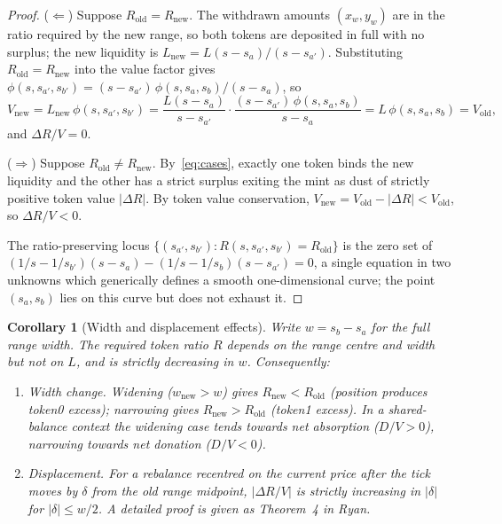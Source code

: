 \documentclass[11pt,a4paper]{article}
\newtheorem*{corollary}{Corollary}
\begin{document}
\begin{proof}
($\Leftarrow$) Suppose $R_{\text{old}} = R_{\text{new}}$. The withdrawn amounts $(x_w, y_w)$ are in the ratio required by the new range, so both tokens are deposited in full with no surplus; the new liquidity is $L_{\text{new}} = L(s - s_a)/(s - s_{a'})$. Substituting $R_{\text{old}} = R_{\text{new}}$ into the value factor gives $\phi(s, s_{a'}, s_{b'}) = (s - s_{a'})\,\phi(s, s_a, s_b)/(s - s_a)$, so
\[
V_{\text{new}} = L_{\text{new}}\,\phi(s, s_{a'}, s_{b'}) = \frac{L(s - s_a)}{s - s_{a'}} \cdot \frac{(s - s_{a'})\,\phi(s, s_a, s_b)}{s - s_a} = L\,\phi(s, s_a, s_b) = V_{\text{old}},
\]
and $\Delta R/V = 0$.

($\Rightarrow$) Suppose $R_{\text{old}} \neq R_{\text{new}}$. By~\eqref{eq:cases}, exactly one token binds the new liquidity and the other has a strict surplus exiting the mint as dust of strictly positive token value $|\Delta R|$. By token value conservation, $V_{\text{new}} = V_{\text{old}} - |\Delta R| < V_{\text{old}}$, so $\Delta R/V < 0$.

The ratio-preserving locus $\{(s_{a'}, s_{b'}) : R(s, s_{a'}, s_{b'}) = R_{\text{old}}\}$ is the zero set of $(1/s - 1/s_{b'})(s - s_a) - (1/s - 1/s_b)(s - s_{a'}) = 0$, a single equation in two unknowns which generically defines a smooth one-dimensional curve; the point $(s_a, s_b)$ lies on this curve but does not exhaust it.
\end{proof}

\begin{corollary}[Width and displacement effects]
Write $w = s_b - s_a$ for the full range width. The required token ratio $R$ depends on the range centre and width but not on $L$, and is strictly decreasing in $w$. Consequently:
\begin{enumerate}[label=(\roman*),leftmargin=*]
    \item \emph{Width change.} Widening ($w_{\text{new}} > w$) gives $R_{\text{new}} < R_{\text{old}}$ (position produces token0 excess); narrowing gives $R_{\text{new}} > R_{\text{old}}$ (token1 excess). In a shared-balance context the widening case tends towards net absorption ($D/V > 0$), narrowing towards net donation ($D/V < 0$).
    \item \emph{Displacement.} For a rebalance recentred on the current price after the tick moves by $\delta$ from the old range midpoint, $|\Delta R/V|$ is strictly increasing in $|\delta|$ for $|\delta| \leq w/2$. A detailed proof is given as Theorem~4 in Ryan\cite{ryan2026b}.
\end{enumerate}
\end{corollary}
\end{document}
